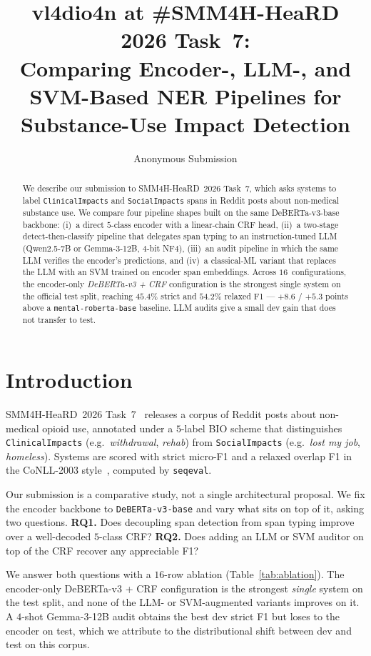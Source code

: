 \documentclass[11pt]{article}
\title{vl4dio4n at \#SMM4H-HeaRD 2026 Task~7:\\
  Comparing Encoder-, LLM-, and SVM-Based NER Pipelines for
  Substance-Use Impact Detection}
\author{Anonymous Submission}
\begin{document}
\maketitle

\begin{abstract}
We describe our submission to SMM4H-HeaRD~2026 Task~7, which asks
systems to label \texttt{ClinicalImpacts} and \texttt{SocialImpacts}
spans in Reddit posts about non-medical substance use. We compare
four pipeline shapes built on the same DeBERTa-v3-base backbone:
(i)~a direct $5$-class encoder with a linear-chain CRF head, (ii)~a
two-stage detect-then-classify pipeline that delegates span typing
to an instruction-tuned LLM (Qwen2.5-7B or Gemma-3-12B, $4$-bit
NF4), (iii)~an audit pipeline in which the same LLM verifies the
encoder's predictions, and (iv)~a classical-ML variant that replaces
the LLM with an SVM trained on encoder span embeddings. Across
$16$~configurations, the encoder-only \emph{DeBERTa-v3 + CRF}
configuration is the strongest single system on the official test
split, reaching $45.4\%$ strict and $54.2\%$ relaxed F1 --- $+8.6$ /
$+5.3$ points above a \texttt{mental-roberta-base} baseline. LLM
audits give a small dev gain that does not transfer to test.
\end{abstract}

\section{Introduction}
\label{sec:introduction}

SMM4H-HeaRD~2026 Task~7~\cite{dey2025inference} releases a corpus of
Reddit posts about non-medical opioid use, annotated under a
$5$-label BIO scheme that distinguishes
\texttt{ClinicalImpacts} (e.g.\ \emph{withdrawal}, \emph{rehab})
from \texttt{SocialImpacts} (e.g.\ \emph{lost my job},
\emph{homeless}). Systems are scored with strict micro-F1 and a
relaxed overlap F1 in the CoNLL-2003
style~\cite{tjong2003conll}, computed by \texttt{seqeval}.

Our submission is a comparative study, not a single architectural
proposal. We fix the encoder backbone to \texttt{DeBERTa-v3-base}
\cite{he2023debertav3} and vary what sits on top of it, asking two
questions. \textbf{RQ1.} Does decoupling span detection from span
typing improve over a well-decoded $5$-class CRF? \textbf{RQ2.} Does
adding an LLM or SVM auditor on top of the CRF recover any
appreciable F1?

We answer both questions with a $16$-row ablation
(Table~\ref{tab:ablation}). The encoder-only DeBERTa-v3 + CRF
configuration is the strongest \emph{single} system on the test
split, and none of the LLM- or SVM-augmented variants improves on
it. A $4$-shot Gemma-3-12B audit obtains the best dev strict F1 but
loses to the encoder on test, which we attribute to the
distributional shift between dev and test on this corpus.
\end{document}
